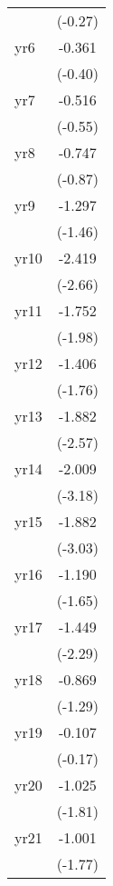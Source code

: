 {\begin{tabular}{l*{1}{c}}
            &     (-0.27)         \\
[1em]
yr6         &      -0.361         \\
            &     (-0.40)         \\
[1em]
yr7         &      -0.516         \\
            &     (-0.55)         \\
[1em]
yr8         &      -0.747         \\
            &     (-0.87)         \\
[1em]
yr9         &      -1.297         \\
            &     (-1.46)         \\
[1em]
yr10        &      -2.419\sym{**} \\
            &     (-2.66)         \\
[1em]
yr11        &      -1.752\sym{*}  \\
            &     (-1.98)         \\
[1em]
yr12        &      -1.406         \\
            &     (-1.76)         \\
[1em]
yr13        &      -1.882\sym{*}  \\
            &     (-2.57)         \\
[1em]
yr14        &      -2.009\sym{**} \\
            &     (-3.18)         \\
[1em]
yr15        &      -1.882\sym{**} \\
            &     (-3.03)         \\
[1em]
yr16        &      -1.190         \\
            &     (-1.65)         \\
[1em]
yr17        &      -1.449\sym{*}  \\
            &     (-2.29)         \\
[1em]
yr18        &      -0.869         \\
            &     (-1.29)         \\
[1em]
yr19        &      -0.107         \\
            &     (-0.17)         \\
[1em]
yr20        &      -1.025         \\
            &     (-1.81)         \\
[1em]
yr21        &      -1.001         \\
            &     (-1.77)         \\

\end{tabular}}
